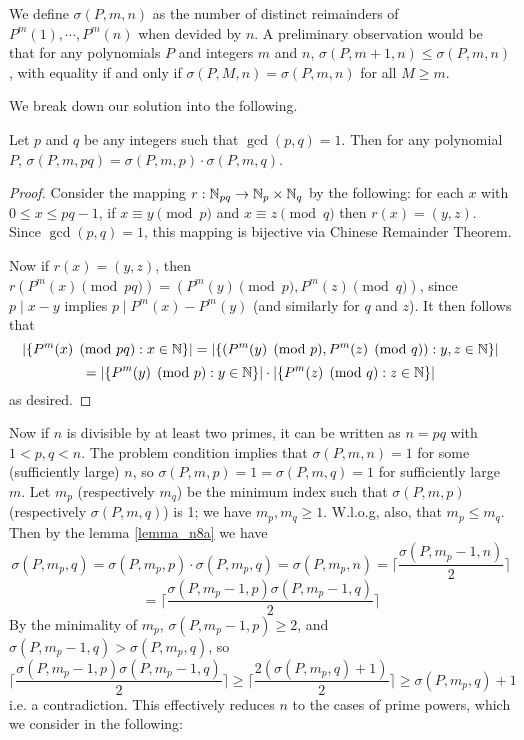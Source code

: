 \documentclass[11pt,a4paper]{article}
\begin{document}
\begin{enumerate}
	    We define $\sigma(P, m, n)$ as the number of distinct reimainders of $P^m(1), \cdots, P^m(n)$ when devided by $n$. 
	    A preliminary observation would be that for any polynomials $P$ and integers $m$ and $n$, 
	    $\sigma(P, m + 1, n)\le \sigma(P, m, n)$, with equality if and only if $\sigma(P, M, n)=\sigma(P, m, n)$ for all $M\ge m$. 
	    
	    We break down our solution into the following. 
	    
	    \begin{lemma}
	    	\label{lemma_n8a}
	    	Let $p$ and $q$ be any integers such that $\gcd(p, q)=1$. 
	    	Then for any polynomial $P$, $\sigma(P, m, pq)=\sigma(P, m, p)\cdot \sigma(P, m, q)$. 
	    \end{lemma}
        
        \begin{proof}
        	Consider the mapping $r: {\mathbb N}_{pq}\to {\mathbb N}_{p}\times {\mathbb N}_{q}$ by the following: 
        	for each $x$ with $0\le x\le pq-1$, if $x\equiv y\pmod{p}$ and $x\equiv z\pmod{q}$ 
        	then $r(x)=(y, z)$. Since $\gcd(p, q)=1$, this mapping is bijective via Chinese Remainder Theorem. 
        	
        	Now if $r(x)=(y, z)$, then $r(P^m(x)\pmod{pq})=(P^m(y)\pmod{p}, P^m(z)\pmod{q})$, since 
        	$p\mid x-y$ implies $p\mid P^m(x) - P^m(y)$ (and similarly for $q$ and $z$). It then follows that 
        	\[
        	|\{P^m(x)\pmod{pq}: x\in{\mathbb N}\}|
        	=|\{(P^m(y)\pmod{p}, P^m(z)\pmod{q}): y, z\in{\mathbb N}\}|
        	\]
        	\[
        	=|\{P^m(y)\pmod{p}: y\in{\mathbb N}\}|\cdot |\{ P^m(z)\pmod{q}: z\in{\mathbb N}\}|
        	\]
        	as desired. 
        \end{proof}
    
        Now if $n$ is divisible by at least two primes, it can be written as $n=pq$ with $1<p, q<n$. 
        The problem condition implies that $\sigma(P, m, n)=1$ for some (sufficiently large) $n$, 
        so $\sigma(P, m, p)=1=\sigma(P, m, q)=1$ for sufficiently large $m$. 
        Let $m_p$ (respectively $m_q$) be the minimum index such that $\sigma(P, m, p)$ (respectively $\sigma(P, m, q)$) is 1; 
        we have $m_p, m_q\ge 1$. 
        W.l.o.g, also, that $m_p\le m_q$. 
        Then by the lemma \ref{lemma_n8a} we have 
        \[
        \sigma(P, m_p, q) = \sigma(P, m_p, p)\cdot \sigma(P, m_p, q)
        =\sigma(P, m_p, n)
        =\lceil\frac{\sigma(P, m_p - 1, n)}{2}\rceil
        \]\[
        =\lceil\frac{\sigma(P, m_p - 1, p) \sigma(P, m_p - 1, q)}{2}\rceil
        \]
        By the minimality of $m_p$, $\sigma(P, m_p - 1, p)\ge 2$, 
        and $\sigma(P, m_p - 1, q) > \sigma(P, m_p, q)$, so 
        \[
        \lceil\frac{\sigma(P, m_p - 1, p) \sigma(P, m_p - 1, q)}{2}\rceil
        \ge \lceil\frac{2( \sigma(P, m_p, q) + 1)}{2}\rceil
        \ge \sigma(P, m_p, q) + 1
        \]
        i.e. a contradiction. 
        This effectively reduces $n$ to the cases of prime powers, which we consider in the following: 
        

\end{enumerate}
\end{document}
